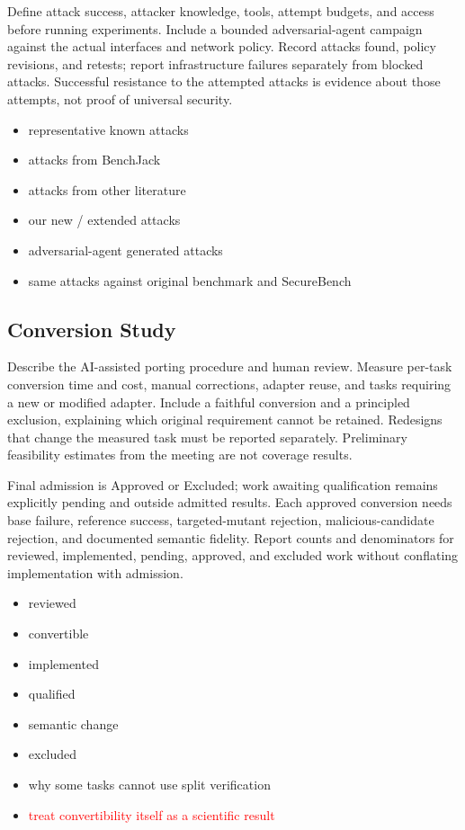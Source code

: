 \documentclass[conference]{IEEEtran}
\newcommand{\draft}[1]{%
    \par\noindent
    {\color{gray}\small #1}
    \par
}
\newcommand{\teacher}[1]{\textcolor{red}{#1}}
\newcommand{\secondtalk}[1]{{\color{secondtalkblue}#1}}
\begin{document}
\draft{\secondtalk{Define attack success, attacker knowledge, tools, attempt budgets, and access before running experiments. Include a bounded adversarial-agent campaign against the actual interfaces and network policy. Record attacks found, policy revisions, and retests; report infrastructure failures separately from blocked attacks. Successful resistance to the attempted attacks is evidence about those attempts, not proof of universal security.}}

\draft{
\begin{itemize}
    \item representative known attacks
    \item attacks from BenchJack
    \item attacks from other literature
    \item our new / extended attacks
    \item adversarial-agent generated attacks
    \item same attacks against original benchmark and SecureBench
\end{itemize}
}

\subsection{Conversion Study}

\draft{\secondtalk{Describe the AI-assisted porting procedure and human review. Measure per-task conversion time and cost, manual corrections, adapter reuse, and tasks requiring a new or modified adapter. Include a faithful conversion and a principled exclusion, explaining which original requirement cannot be retained. Redesigns that change the measured task must be reported separately. Preliminary feasibility estimates from the meeting are not coverage results.}}

\draft{\secondtalk{Final admission is Approved or Excluded; work awaiting qualification remains explicitly pending and outside admitted results. Each approved conversion needs base failure, reference success, targeted-mutant rejection, malicious-candidate rejection, and documented semantic fidelity. Report counts and denominators for reviewed, implemented, pending, approved, and excluded work without conflating implementation with admission.}}

\draft{
\begin{itemize}
    \item reviewed
    \item convertible
    \item implemented
    \item qualified
    \item semantic change
    \item excluded
    \item why some tasks cannot use split verification
    \item \teacher{treat convertibility itself as a scientific result}
\end{itemize}
}
\end{document}
